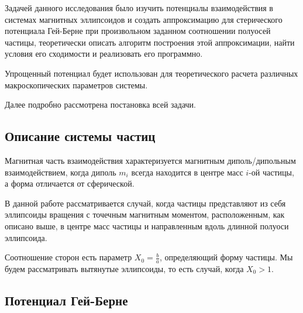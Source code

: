 \documentclass[a4paper,14pt]{extarticle}
\begin{document}
    Задачей данного исследования было изучить потенциалы
    взаимодействия в системах магнитных эллипсоидов и
    создать аппроксимацию для стерического потенциала
    Гей-Берне при произвольном заданном соотношении
    полуосей частицы, теоретически описать алгоритм
    построения этой аппроксимации, найти условия его сходимости
    и реализовать его программно.

    Упрощенный потенциал будет использован для
    теоретического расчета различных макроскопических
    параметров системы.

    Далее подробно рассмотрена постановка всей задачи.

    \subsection{Описание системы частиц}

    Магнитная часть взаимодействия характеризуется магнитным диполь\-/дипольным взаимодействием, когда диполь $m_i$ всегда находится в центре масс $i$-ой частицы, а форма отличается от сферической.

    В данной работе рассматривается случай, когда частицы представляют из себя эллипсоиды вращения с точечным магнитным моментом, расположенным, как описано выше, в центре масс частицы и направленным вдоль длинной полуоси эллипсоида.

    Соотношение сторон есть параметр $X_0 = \frac{b}{a}$, определяющий форму частицы. Мы будем рассматривать вытянутые эллипсоиды, то есть случай, когда $X_0 > 1$.

    \subsection{Потенциал Гей-Берне}
\end{document}
